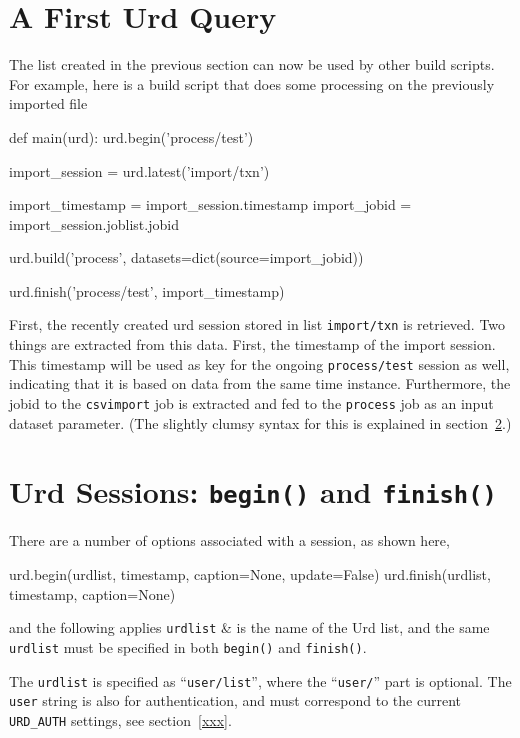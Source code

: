 \section{A First Urd Query}

The list created in the previous section can now be used by other
build scripts.  For example, here is a build script that does some
processing on the previously imported file
\begin{python}
def main(urd):
    urd.begin('process/test')

    import_session = urd.latest('import/txn')

    import_timestamp = import_session.timestamp
    import_jobid     = import_session.joblist.jobid

    urd.build('process', datasets=dict(source=import_jobid))

    urd.finish('process/test', import_timestamp)
\end{python}
First, the recently created urd session stored in
list \texttt{import/txn} is retrieved.  Two things are extracted from
this data.  First, the timestamp of the import session.  This
timestamp will be used as key for the ongoing \texttt{process/test}
session as well, indicating that it is based on data from the same
time instance.  Furthermore, the jobid to the \texttt{csvimport} job
is extracted and fed to the \texttt{process} job as an input dataset
parameter.  (The slightly clumsy syntax for this is explained in
section~\ref{}.)



\section{Urd Sessions:  \texttt{begin()} and \texttt{finish()}}

There are a number of options associated with a session, as shown
here,
\begin{python}
urd.begin(urdlist, timestamp, caption=None, update=False)
urd.finish(urdlist, timestamp, caption=None)
\end{python}
and the following applies
\starttabletwo
\RPtwo \texttt{urdlist} & is the name of the Urd list, and the same
  \texttt{urdlist} must be specified in both \texttt{begin()}
  and \texttt{finish()}.

  The \texttt{urdlist} is specified as ``\texttt{user/list}'', where
  the ``\texttt{user/}'' part is optional.  The \texttt{user} string
  is also for authentication, and must correspond to the
  current \texttt{URD\_AUTH} settings, see section~\ref{xxx}.\\[2ex]

